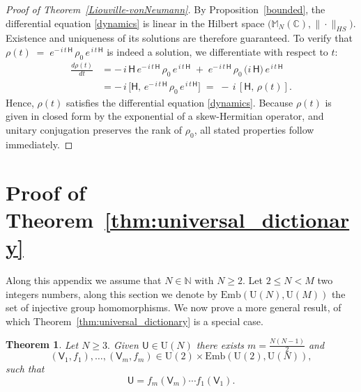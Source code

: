 \documentclass[a4paper,11pt]{article}
\newtheorem{theorem}{Theorem}[section]
\newcommand{\rH}{\mathsf{H}}
\newcommand{\rU}{\mathsf{U}}
\newcommand{\rV}{\mathsf{V}}
\begin{document}
\begin{appendices}
\begin{proof}[Proof of Theorem~\ref{Liouville-vonNeumann}]
By Proposition~\ref{bounded}, the differential equation \eqref{dynamics} is linear in the Hilbert space 
\(\bigl(\mathbb{M}_{N}(\mathbb{C}), \|\cdot\|_{HS}\bigr)\). Existence and uniqueness of its solutions 
are therefore guaranteed.  To verify that 
\(
\rho(t) \;=\; e^{-\,i\,t\,\rH} \,\rho_{0}\, e^{\,i\,t\,\rH}
\)
is indeed a solution, we differentiate with respect to \(t\):
\begin{align*}
\frac{d\rho(t)}{dt} & =
-\,i\,\rH\,e^{-\,i\,t\,\rH}\,\rho_{0}\,e^{\,i\,t\,\rH}
\;+\;
e^{-\,i\,t\,\rH}\,\rho_{0}\,\bigl(i\,\rH\bigr)\,e^{\,i\,t\,\rH} \\
& =
-\,i\,\bigl[\rH,\,e^{-\,i\,t\,\rH}\,\rho_{0}\,e^{\,i\,t\,\rH}\bigr]
\;=\;
-\,i\,[\rH,\,\rho(t)].
\end{align*}
Hence, \(\rho(t)\) satisfies the differential equation \eqref{dynamics}. 
Because \(\rho(t)\) is given in closed form by the exponential of a skew-Hermitian operator, 
and unitary conjugation preserves the rank of \(\rho_{0}\), 
all stated properties follow immediately.
\end{proof}




\section{Proof of Theorem~\ref{thm:universal_dictionary}}\label{Appendix_A}
  
  Along this appendix we assume that $N \in \mathbb{N}$ with $N\ge 2.$ Let $2 \le N < M$ two integers numbers, along this section we denote by  $\mathrm{Emb}(\mathrm{U}(N),\mathrm{U}(M))$ the set of injective group homomorphisms. We now prove a more general result, of which Theorem~\ref{thm:universal_dictionary} is a special case.


\begin{theorem}\label{general_universal_dictionary}
Let $N \ge 3.$ Given $\rU \in \mathrm{U}(N)$ there exists 
$m=\frac{N(N-1)}{2}$ and 
$$
(\rV_1,f_1),\ldots,(\rV_m,f_m) \in \mathrm{U}(2) \times 
\mathrm{Emb}(\mathrm{U}(2),\mathrm{U}(N)),
$$
such that 
$$
\rU = f_m(\rV_m)\cdots f_1(\rV_1).
$$
\end{theorem}

  
  

\end{appendices}
\end{document}
